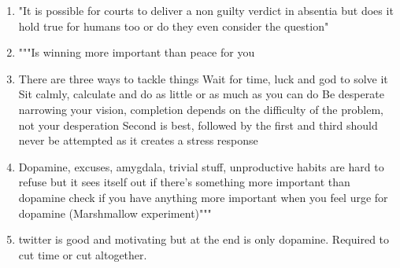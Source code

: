 \documentclass{article}
\begin{document}
\begin{enumerate}

\item "It is possible for courts to deliver a non guilty verdict in absentia but does it hold true for humans too or do they even consider the question"

\item """Is winning more important than peace for you

\item There are three ways to tackle things 
Wait for time, luck and god to solve it
Sit calmly, calculate and do as little or as much as you can do
Be desperate narrowing your vision, completion depends on the difficulty of the problem, not your desperation
Second is best, followed by the first and third should never be attempted as it creates a stress response 

\item Dopamine, excuses, amygdala, trivial stuff, unproductive habits are hard to refuse but it sees itself out if there's something more important than dopamine check if you have anything more important when you feel urge for dopamine (Marshmallow experiment)"""
\item twitter is good and motivating but at the end is only dopamine. Required to cut time or cut altogether. 
\end{enumerate}
\end{document}
